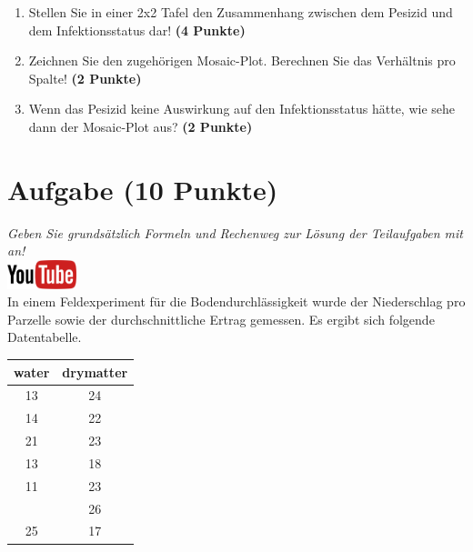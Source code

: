 \documentclass[a4paper, 10pt]{scrartcl}\usepackage[]{graphicx}\usepackage[]{xcolor}
\begin{document}
\begin{enumerate}
\item Stellen Sie in einer 2x2 Tafel den Zusammenhang zwischen dem
  Pesizid und dem Infektionsstatus dar! \textbf{(4 Punkte)}
\item Zeichnen Sie den zugeh{\"o}rigen Mosaic-Plot. Berechnen Sie das
  Verh{\"a}ltnis pro Spalte! \textbf{(2 Punkte)}
\item Wenn das Pesizid keine Auswirkung auf den Infektionsstatus h{\"a}tte, wie
  sehe dann der Mosaic-Plot aus? \textbf{(2 Punkte)}
\end{enumerate} 
\clearpage

\section{Aufgabe \hfill (10 Punkte)}

\textit{Geben Sie grunds{\"a}tzlich Formeln und Rechenweg zur L{\"o}sung der
  Teilaufgaben mit an!} \\[1Ex]

\hfill\href{https://youtu.be/VAqiUdV4WQ0}{\includegraphics[width =
  2cm]{img/youtube}}\\[1Ex]

In einem Feldexperiment f{\"u}r die Bodendurchl{\"a}ssigkeit wurde der Niederschlag
pro Parzelle sowie der durchschnittliche Ertrag gemessen. Es ergibt sich
folgende Datentabelle. 

\begin{table}[!h]
\centering
\begin{tabular}{cc}
\toprule
water & drymatter\\
\midrule
13 & 24\\
14 & 22\\
21 & 23\\
13 & 18\\
11 & 23\\
\addlinespace
4 & 26\\
25 & 17\\
\bottomrule
\end{tabular}
\end{table}
\end{document}
